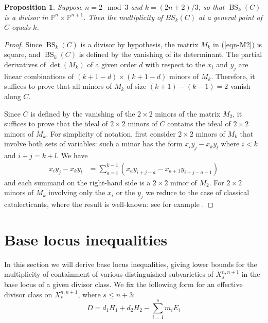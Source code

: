 \documentclass[a4paper,11pt]{article}
\newtheorem{proposition}[theorem]{Proposition}
\newcommand{\BS}{\operatorname{BS}}
\newcommand{\ourproduct}{\mathbb P^n \times \mathbb P^{n+1}}
\newcommand{\ourproductblowup}[1]{X^{n,n+1}_{#1}}
\begin{document}
\begin{proposition}\label{prop-secantmult}
Suppose $n=2\mod 3$ and $k=(2n+2)/3$, so that $\BS_k(C)$ is a divisor in $\ourproduct$. Then the multiplicity of $BS_k(C)$ at a general point of $C$ equals $k$.
\end{proposition}
\begin{proof}
Since $\BS_k(C)$ is a divisor by hypothesis, the matrix $M_k$ in (\ref{eqn-M2}) is square, and $\BS_k(C)$ is defined by the vanishing of its determinant. The partial derivatives of $\det(M_k)$ of a given order $d$ with respect to the $x_i$ and $y_j$ are linear combinations of $(k+1-d)\times(k+1-d)$ minors of $M_k$. Therefore, it suffices to prove that all minors of $M_k$ of size $(k+1)-(k-1)=2$ vanish along $C$. 

Since $C$ is defined by the vanishing of the $2 \times 2$ minors of the matrix $M_2$, it suffices to prove that the ideal of $2 \times 2$ minors of $C$ contains the ideal of $2 \times 2$ minors of $M_k$. For simplicity of notation, first consider $2 \times 2$ minors of $M_k$ that involve both sets of variables: such a minor has the form $x_i y_j - x_k y_l$ where $i<k$ and $i+j=k+l$. We have
\begin{align*}
    x_iy_j-x_ky_l &= \sum_{a=i}^{k-1} \left( x_a y_{i+j-a} -x_{a+1} y_{i+j-a-1} \right)
\end{align*}
and each summand on the right-hand side is a $2 \times 2$ minor of $M_2$. For $2 \times 2$ minors of $M_k$ involving only the $x_i$ or the $y_j$ we reduce to the case of classical catalecticants, where the result is well-known: see for example \cite[Proposition 9.7]{Harr92}.
\end{proof}


\section{Base locus inequalities} \label{section-bli}

In this section we will derive base locus inequalities, giving lower bounds for the multiplicity of containment of various distinguished subvarieties of $\ourproductblowup{s}$ in the base locus of a given divisor class. We fix the following form for an effective divisor class on $\ourproductblowup{s}$, where $s \leq n+3$:
\begin{equation}\label{general form divisor}
D=d_1H_1+d_2H_2-\sum_{i=1}^sm_iE_i\end{equation}
\end{document}
